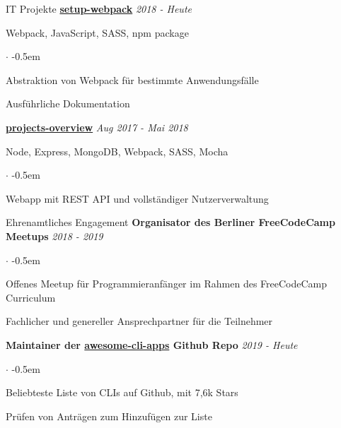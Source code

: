 \documentclass{cv}
\begin{document}
\begin{rSection}{IT Projekte}
  \textbf{\href{https://github.com/jneidel/setup-webpack}{setup-webpack}}
  \hfill
  {\em 2018 - Heute}

  Webpack, JavaScript, SASS, npm package
  \begin{list}{$\cdot$}{}
    \itemsep -0.5em \vspace{-0.5em}
    \smallskip
    \item Abstraktion von Webpack für bestimmte Anwendungsfälle
    \item Ausführliche Dokumentation
  \end{list}

  \textbf{\href{https://github.com/jneidel/projects-overview}{projects-overview}}
  \hfill
  {\em Aug 2017 - Mai 2018}

  Node, Express, MongoDB, Webpack, SASS, Mocha
  \begin{list}{$\cdot$}{}
    \itemsep -0.5em \vspace{-0.5em}
    \smallskip
    \item Webapp mit REST API und vollständiger Nutzerverwaltung
  \end{list}



\end{rSection}

\begin{rSection}{Ehrenamtliches Engagement}
  {\bf Organisator des Berliner FreeCodeCamp Meetups}
  \hfill
  {\em 2018 - 2019}

  \begin{list}{$\cdot$}{}
    \itemsep -0.5em \vspace{-0.5em}
    \smallskip
    \item Offenes Meetup für Programmieranfänger im Rahmen des FreeCodeCamp Curriculum
    \item Fachlicher und genereller Ansprechpartner für die Teilnehmer
  \end{list}

  {\bf Maintainer der \href{https://github.com/agarrharr/awesome-cli-apps}{awesome-cli-apps} Github Repo}
  \hfill
  {\em 2019 - Heute}

  \begin{list}{$\cdot$}{}
    \itemsep -0.5em \vspace{-0.5em}
    \smallskip
    \item Beliebteste Liste von CLIs auf Github, mit 7,6k Stars
    \item Prüfen von Anträgen zum Hinzufügen zur Liste
  \end{list}
\end{rSection}
\end{document}

